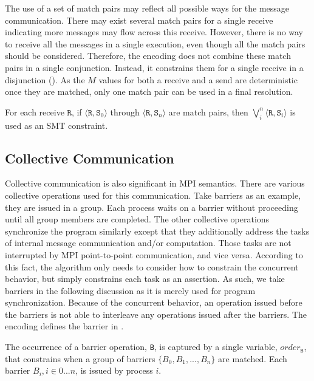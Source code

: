 The use of a set of match pairs may reflect all possible ways for the message communication. There may exist several match pairs for a single receive indicating more messages may flow across this receive. However, there is no way to receive all the messages in a single execution, even though all the match pairs should be considered. Therefore, the encoding does not combine these match pairs in a single conjunction. Instead, it constrains them for a single receive in a disjunction (). As the $M$ values for both a receive and a send are deterministic once they are matched, only one match pair can be used in a final resolution.

\begin{definition} \label{def:receive_match}
For each receive $\mathtt{R}$, if $\langle\mathtt{R},
\mathtt{S}_0\rangle$ through $\langle\mathtt{R}, \mathtt{S}_n\rangle$
are match pairs, then $\bigvee_{i}^{n} \langle\mathtt{R},
\mathtt{S}_i\rangle$ is used as an SMT constraint.
\end{definition}


\subsection{Collective Communication}
Collective communication is also significant in MPI semantics. There are various collective operations used for this communication.  Take barriers as an example, they are issued in a group. Each process waits on a barrier without proceeding until all group members are completed. The other collective operations synchronize the program similarly except that they additionally address the tasks of internal message communication and/or computation. Those tasks are not interrupted by MPI point-to-point communication, and vice versa. According to this fact, the algorithm only needs to consider how to constrain the concurrent behavior, but simply constrains each task as an assertion. As such, we take barriers in the following discussion as it is merely used for program synchronization. Because of the concurrent behavior, an operation issued before the barriers is not able to interleave any operations issued after the barriers. The encoding defines the barrier in . 

\begin{definition}[Barrier]\label{def:barrier}
The occurrence of a barrier operation, \texttt{B}, is captured by a
single variable, $\mathit{order}_\mathtt{B}$, that constrains when a group of barriers $\{B_0, B_1, ..., B_n\}$ are matched.  
Each barrier $B_i, i\in{0 ... n}$, is issued by process $i$. 
\end{definition}


